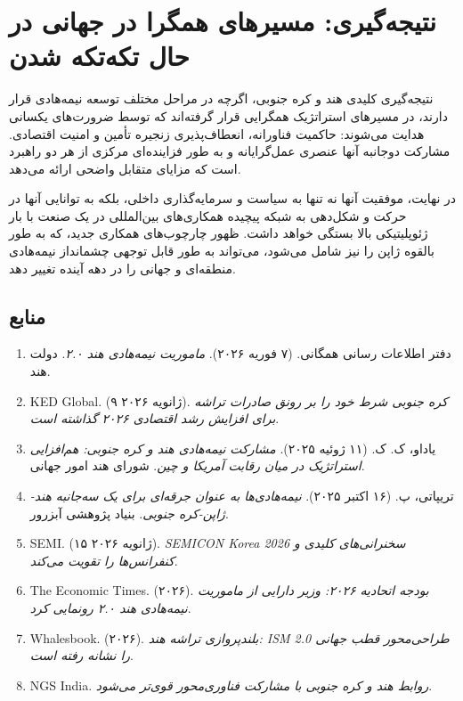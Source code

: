 \documentclass[10pt]{report}
\begin{document}
\chapter{نتیجه‌گیری: مسیرهای همگرا در جهانی در حال تکه‌تکه شدن}

\begin{summarybox}{نتیجه‌گیری کلیدی}
هند و کره جنوبی، اگرچه در مراحل مختلف توسعه نیمه‌هادی قرار دارند، در مسیرهای استراتژیک همگرایی قرار گرفته‌اند که توسط ضرورت‌های یکسانی هدایت می‌شوند: حاکمیت فناورانه، انعطاف‌پذیری زنجیره تأمین و امنیت اقتصادی. مشارکت دوجانبه آنها عنصری عمل‌گرایانه و به طور فزاینده‌ای مرکزی از هر دو راهبرد است که مزایای متقابل واضحی ارائه می‌دهد.
\end{summarybox}

در نهایت، موفقیت آنها نه تنها به سیاست و سرمایه‌گذاری داخلی، بلکه به توانایی آنها در حرکت و شکل‌دهی به شبکه پیچیده همکاری‌های بین‌المللی در یک صنعت با بار ژئوپلیتیکی بالا بستگی خواهد داشت. ظهور چارچوب‌های همکاری جدید، که به طور بالقوه ژاپن را نیز شامل می‌شود، می‌تواند به طور قابل توجهی چشمانداز نیمه‌هادی منطقه‌ای و جهانی را در دهه آینده تغییر دهد.

\section*{منابع}
\begin{enumerate}[rightmargin=1.5cm]
    \item دفتر اطلاعات رسانی همگانی. (۷ فوریه ۲۰۲۶). \textit{ماموریت نیمه‌هادی هند ۲.۰}. دولت هند.
    \item KED Global. (۹ ژانویه ۲۰۲۶). \textit{کره جنوبی شرط خود را بر رونق صادرات تراشه برای افزایش رشد اقتصادی ۲۰۲۶ گذاشته است}.
    \item یاداو، ک. ک. (۱۱ ژوئیه ۲۰۲۵). \textit{مشارکت نیمه‌هادی هند و کره جنوبی: هم‌افزایی استراتژیک در میان رقابت آمریکا و چین}. شورای هند امور جهانی.
    \item تریپاتی، پ. (۱۶ اکتبر ۲۰۲۵). \textit{نیمه‌هادی‌ها به عنوان جرقه‌ای برای یک سه‌جانبه هند-ژاپن-کره جنوبی}. بنیاد پژوهشی آبزرور.
    \item SEMI. (۱۵ ژانویه ۲۰۲۶). \textit{SEMICON Korea 2026 سخنرانی‌های کلیدی و کنفرانس‌ها را تقویت می‌کند}.
    \item The Economic Times. (۲۰۲۶). \textit{بودجه اتحادیه ۲۰۲۶: وزیر دارایی از ماموریت نیمه‌هادی هند ۲.۰ رونمایی کرد}.
    \item Whalesbook. (۲۰۲۶). \textit{بلندپروازی تراشه هند: ISM 2.0 طراحی‌محور قطب جهانی را نشانه رفته است}.
    \item NGS India. \textit{روابط هند و کره جنوبی با مشارکت فناوری‌محور قوی‌تر می‌شود}.
\end{enumerate}
\end{document}
